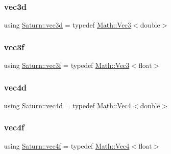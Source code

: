 \mbox{\label{namespace_saturn_ad7ac3aac73d4094ccaed478f0b2c13b0}} 
\subsubsection{\texorpdfstring{vec3d}{vec3d}}
{\footnotesize\ttfamily using \mbox{\hyperlink{namespace_saturn_ad7ac3aac73d4094ccaed478f0b2c13b0}{Saturn\+::vec3d}} = typedef \mbox{\hyperlink{namespace_saturn_1_1_math_af4a7a893730c64ac02b620f648cc5406}{Math\+::\+Vec3}}$<$double$>$}

\mbox{\label{namespace_saturn_ac487f08aa215d1835c4859788e4e552a}} 
\subsubsection{\texorpdfstring{vec3f}{vec3f}}
{\footnotesize\ttfamily using \mbox{\hyperlink{namespace_saturn_ac487f08aa215d1835c4859788e4e552a}{Saturn\+::vec3f}} = typedef \mbox{\hyperlink{namespace_saturn_1_1_math_af4a7a893730c64ac02b620f648cc5406}{Math\+::\+Vec3}}$<$float$>$}

\mbox{\label{namespace_saturn_acb87b8b4026beeda9cb50181bde1bd04}} 
\subsubsection{\texorpdfstring{vec4d}{vec4d}}
{\footnotesize\ttfamily using \mbox{\hyperlink{namespace_saturn_acb87b8b4026beeda9cb50181bde1bd04}{Saturn\+::vec4d}} = typedef \mbox{\hyperlink{namespace_saturn_1_1_math_a311b3d690ef397050af7963caa08d1bd}{Math\+::\+Vec4}}$<$double$>$}

\mbox{\label{namespace_saturn_ac72dd80c10cd8042d762656b2793d36f}} 
\subsubsection{\texorpdfstring{vec4f}{vec4f}}
{\footnotesize\ttfamily using \mbox{\hyperlink{namespace_saturn_ac72dd80c10cd8042d762656b2793d36f}{Saturn\+::vec4f}} = typedef \mbox{\hyperlink{namespace_saturn_1_1_math_a311b3d690ef397050af7963caa08d1bd}{Math\+::\+Vec4}}$<$float$>$}

